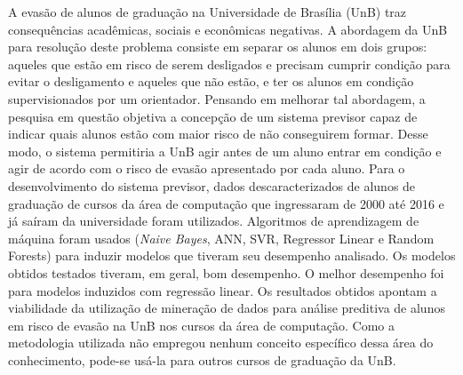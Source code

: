 A evasão de alunos de graduação na Universidade de Brasília (UnB) traz consequências
acadêmicas, sociais e econômicas negativas. A abordagem da UnB para resolução deste problema
consiste em separar os alunos em dois grupos: aqueles que estão em risco de serem
desligados e precisam cumprir condição para evitar o desligamento e
aqueles que não estão, e ter os alunos em condição supervisionados por um orientador. 
Pensando em melhorar tal abordagem, a pesquisa em questão objetiva a concepção de um
sistema previsor capaz de indicar quais alunos estão com maior risco de não
conseguirem formar.  Desse modo, o sistema permitiria a UnB agir antes de um aluno
entrar em condição e agir de acordo com o risco de evasão apresentado por cada aluno.
Para o desenvolvimento do sistema previsor, dados descaracterizados de alunos de
graduação de cursos da área de computação que
ingressaram de 2000 até 2016 e já saíram da universidade foram utilizados.
Algoritmos de aprendizagem de máquina foram usados (\textit{Naive Bayes}, ANN, SVR,
Regressor Linear e Random Forests) para induzir modelos que tiveram seu desempenho
analisado. 
Os modelos obtidos testados tiveram, em geral, bom desempenho. O
melhor desempenho foi para modelos induzidos com regressão linear. Os resultados
obtidos apontam a viabilidade da utilização de mineração de dados para análise
preditiva de alunos em risco de evasão na UnB nos cursos da área de computação.
Como a metodologia utilizada não empregou nenhum conceito específico dessa área do
conhecimento, pode-se usá-la para outros cursos de graduação da UnB. 
